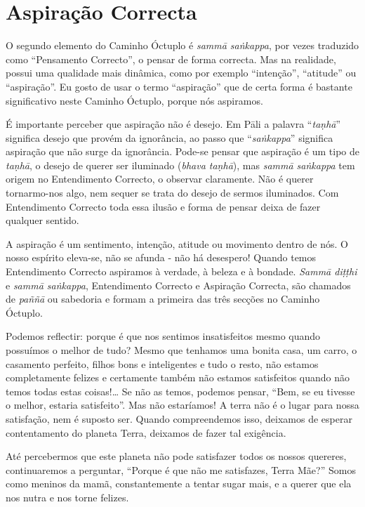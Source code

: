 \section{Aspiração Correcta}

O segundo elemento do Caminho Óctuplo é \emph{sammā saṅkappa}, por vezes traduzido como
“Pensamento Correcto”, o pensar de forma correcta. Mas na realidade, possui uma
qualidade mais dinâmica, como por exemplo “intenção”, “atitude” ou “aspiração”.
Eu gosto de usar o termo “aspiração” que de certa forma é bastante significativo
neste Caminho Óctuplo, porque nós aspiramos.

É importante perceber que aspiração não é desejo. Em Pāli a palavra
“\emph{taṇhā}” significa desejo que provém da ignorância, ao passo que
“\emph{saṅkappa}” significa aspiração que não surge da ignorância. Pode-se
pensar que aspiração é um tipo de \emph{taṇhā}, o desejo de querer ser iluminado
(\emph{bhava taṇhā}), mas \emph{sammā saṅkappa} tem origem no Entendimento
Correcto, o observar claramente. Não é querer tornarmo-nos algo, nem sequer se
trata do desejo de sermos iluminados. Com Entendimento Correcto toda essa ilusão
e forma de pensar deixa de fazer qualquer sentido.

A aspiração é um sentimento, intenção, atitude ou movimento dentro de nós. O
nosso espírito eleva-se, não se afunda - não há desespero! Quando temos
Entendimento Correcto aspiramos à verdade, à beleza e à bondade. \emph{Sammā
  diṭṭhi} e \emph{sammā saṅkappa}, Entendimento Correcto e Aspiração Correcta,
são chamados de \emph{paññā} ou sabedoria e formam a primeira das três secções
no Caminho Óctuplo.

\sectionBreak

Podemos reflectir: porque é que nos sentimos insatisfeitos mesmo quando
possuímos o melhor de tudo? Mesmo que tenhamos uma bonita casa, um carro, o
casamento perfeito, filhos bons e inteligentes e tudo o resto, não estamos
completamente felizes e certamente também não estamos satisfeitos quando não
temos todas estas coisas!\ldots{} Se não as temos, podemos pensar, “Bem, se eu
tivesse o melhor, estaria satisfeito”. Mas não estaríamos! A terra não é o lugar
para nossa satisfação, nem é suposto ser. Quando compreendemos isso, deixamos de
esperar contentamento do planeta Terra, deixamos de fazer tal exigência.

Até percebermos que este planeta não pode satisfazer todos os nossos quereres,
continuaremos a perguntar, “Porque é que não me satisfazes, Terra Mãe?” Somos
como meninos da mamã, constantemente a tentar sugar mais, e a querer que ela nos
nutra e nos torne felizes.

